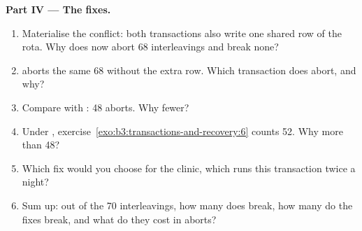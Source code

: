 \begin{problem}
\medskip\noindent\textbf{Part IV --- The fixes.}
\begin{enumerate}[resume]
  \item Materialise the conflict: both transactions also write one shared row of the rota. Why does  now abort 68 interleavings and break none?
  \item {} aborts the same 68 without the extra row. Which transaction does  abort, and why?
  \item Compare with : 48 aborts. Why fewer?
  \item Under , exercise~\ref{exo:b3:transactions-and-recovery:6} counts 52. Why more than 48?
  \item Which fix would you choose for the clinic, which runs this transaction twice a night?
  \item Sum up: out of the 70 interleavings, how many does  break, how many do the fixes break, and what do they cost in aborts?
\end{enumerate}
\end{problem}
